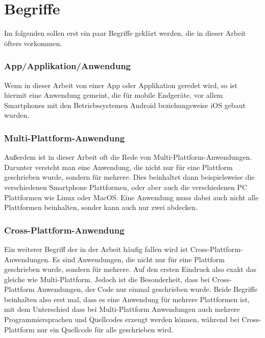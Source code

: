 \section{Begriffe}
Im folgenden sollen erst ein paar Begriffe geklärt werden, die in dieser Arbeit öfters vorkommen.
\subsubsection{App/Applikation/Anwendung}
Wenn in dieser Arbeit von einer App oder Applikation geredet wird, so ist hiermit eine Anwendung gemeint, die für mobile Endgeräte, vor allem Smartphones mit den Betriebssystemen Android beziehungsweise iOS gebaut wurden.
\subsubsection{Multi-Plattform-Anwendung}
Außerdem ist in dieser Arbeit oft die Rede von Multi-Plattform-Anwendungen. Darunter versteht man eine Anwendung, die nicht nur für eine Plattform geschrieben wurde, sondern für mehrere. Dies beinhaltet dann beispielsweise die verschiedenen Smartphone Plattformen, oder aber auch die verschiedenen PC Plattformen wie Linux oder MacOS. Eine Anwendung muss dabei auch nicht alle Plattformen beinhalten, sonder kann auch nur zwei abdecken. 
\subsubsection{Cross-Plattform-Anwendung}
Ein weiterer Begriff der in der Arbeit häufig fallen wird ist Cross-Plattform-Anwendungen. Es sind Anwendungen, die nicht nur für eine Plattform geschrieben wurde, sondern für mehrere. Auf den ersten Eindruck also exakt das gleiche wie Multi-Plattform. Jedoch ist die Besonderheit, dass bei Cross-Plattform Anwendungen, der Code nur einmal geschrieben wurde. Beide Begriffe beinhalten also erst mal, dass es eine Anwendung für mehrere Plattformen ist, mit dem Unterschied dass bei Multi-Plattform Anwendungen auch mehrere Programmiersprachen und Quellcodes erzeugt werden können, während bei Cross-Plattform nur ein Quellcode für alle geschrieben wird.